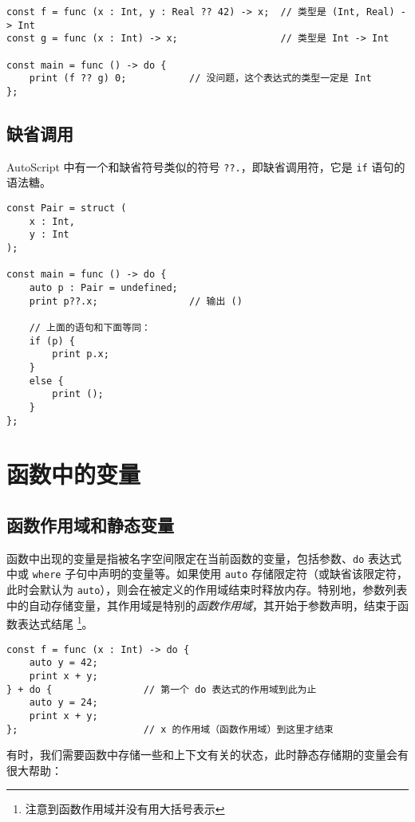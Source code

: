 \begin{lstlisting}
const f = func (x : Int, y : Real ?? 42) -> x;	// 类型是 (Int, Real) -> Int
const g = func (x : Int) -> x;					// 类型是 Int -> Int

const main = func () -> do {
	print (f ?? g) 0;			// 没问题，这个表达式的类型一定是 Int
};
\end{lstlisting}


\subsection{缺省调用}

AutoScript 中有一个和缺省符号类似的符号 \lstinline!??.!，即缺省调用符，它是 \lstinline!if! 语句的语法糖。

\begin{lstlisting}
const Pair = struct (
    x : Int,
    y : Int
);

const main = func () -> do {
    auto p : Pair = undefined;
    print p??.x;				// 输出 ()
    
    // 上面的语句和下面等同：
    if (p) {
        print p.x;
    }
    else {
        print ();
    }
};
\end{lstlisting}


\section{函数中的变量}

\subsection{函数作用域和静态变量}

函数中出现的变量是指被名字空间限定在当前函数的变量，包括参数、\lstinline!do! 表达式中或 \lstinline!where! 子句中声明的变量等。如果使用 \lstinline!auto! 存储限定符（或缺省该限定符，此时会默认为 \lstinline!auto!），则会在被定义的作用域结束时释放内存。特别地，参数列表中的自动存储变量，其作用域是特别的\emph{函数作用域}，其开始于参数声明，结束于函数表达式结尾 \footnote{注意到函数作用域并没有用大括号表示}。

\begin{lstlisting}
const f = func (x : Int) -> do {
	auto y = 42;
	print x + y;
} + do {				// 第一个 do 表达式的作用域到此为止
	auto y = 24;
	print x + y;
};						// x 的作用域（函数作用域）到这里才结束
\end{lstlisting}

有时，我们需要函数中存储一些和上下文有关的状态，此时静态存储期的变量会有很大帮助：

